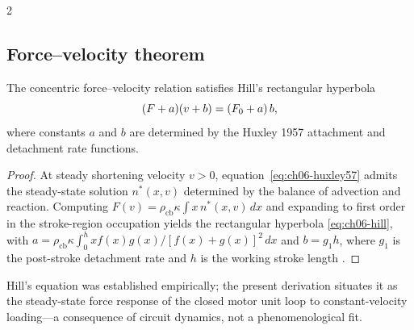 \begin{multicols}{2}
\subsection{Force--velocity theorem}

\begin{theorem}
\label{thm:ch06-fv}
The concentric force--velocity relation satisfies Hill's rectangular
hyperbola
\begin{equation}
  (F + a)(v + b) = (F_{0} + a)\,b,
  \label{eq:ch06-hill}
\end{equation}
where constants $a$ and $b$ are determined by the Huxley 1957 attachment and
detachment rate functions.
\end{theorem}

\begin{proof}
At steady shortening velocity $v > 0$, equation~\eqref{eq:ch06-huxley57}
admits the steady-state solution $n^*(x,v)$ determined by the balance of
advection and reaction.  Computing $F(v) = \rho_{\mathrm{cb}}\kappa\int
x\,n^*(x,v)\,dx$ and expanding to first order in the stroke-region
occupation yields the rectangular hyperbola \eqref{eq:ch06-hill}, with
$a = \rho_{\mathrm{cb}}\kappa\int_0^h xf(x)g(x)/[f(x)+g(x)]^2\,dx$ and
$b = g_1 h$, where $g_1$ is the post-stroke detachment rate and $h$ is the
working stroke length \citep{hill1938,huxley1957}.
\end{proof}

Hill's equation \citep{hill1938} was established empirically; the present
derivation situates it as the steady-state force response of the closed
motor unit loop to constant-velocity loading---a consequence of circuit
dynamics, not a phenomenological fit.

\end{multicols}

